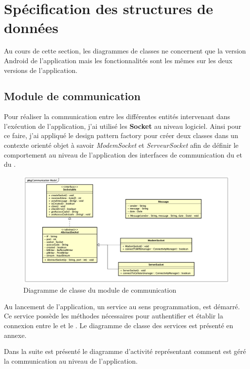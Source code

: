 \section{Spécification des structures de données}
Au cours de cette section, les diagrammes de classes ne concernent que la version Android de l'application mais les fonctionnalités sont les mêmes sur les deux versions de l'application.

\subsection{Module de communication}
Pour réaliser la communication entre les différentes entités intervenant dans l'exécution de l'application, j'ai utilisé les \textbf{Socket} au niveau logiciel. Ainsi pour ce faire, j'ai appliqué le design pattern factory pour créer deux classes dans un contexte orienté objet à savoir \textsl{ModemSocket} et \textsl{ServeurSocket} afin de définir le comportement au niveau de l'application des interfaces de communication du \sv et du \md.
\begin{figure}[H]
	\centering
	\includegraphics[scale=0.4]{assets/images/shv_communication_cd.png}
	\caption{Diagramme de classe du module de communication}
	\label{fig.6}
\end{figure}

Au lancement de l'application, un service au sens programmation, est démarré. Ce service possède les méthodes nécessaires pour authentifier et établir la connexion entre le \sv et le \md. Le diagramme de classe des services est présenté en annexe.

Dans la suite est présenté le diagramme d'activité représentant comment est géré la communication au niveau de l'application.

